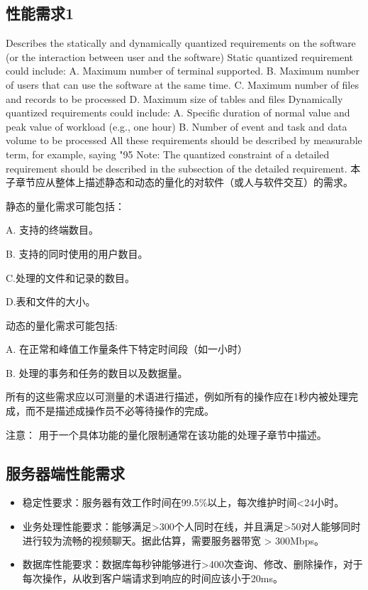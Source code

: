 \subsection{性能需求1}
Describes the statically and dynamically quantized requirements on the software (or the interaction between user and the software)
Static quantized requirement could include:
A. Maximum number of terminal supported.
B. Maximum number of users that can use the software at the same time.
C. Maximum number of files and records to be processed
D. Maximum size of  tables and files
Dynamically quantized requirements could include:
A. Specific duration of normal value and peak value of workload (e.g., one hour)
B. Number of event and task and data volume to be processed 
All these requirements should be described by measurable term, for example, saying "95%
Note: The quantized constraint of a detailed requirement should be described in the subsection of the detailed requirement.
本子章节应从整体上描述静态和动态的量化的对软件（或人与软件交互）的需求。

静态的量化需求可能包括：

A. 支持的终端数目。

B. 支持的同时使用的用户数目。

C.处理的文件和记录的数目。

D.表和文件的大小。

动态的量化需求可能包括:

A. 在正常和峰值工作量条件下特定时间段（如一小时）

B. 处理的事务和任务的数目以及数据量。

所有的这些需求应以可测量的术语进行描述，例如所有的操作应在1秒内被处理完成，而不是描述成操作员不必等待操作的完成。

注意： 用于一个具体功能的量化限制通常在该功能的处理子章节中描述。
\fi
\subsection{服务器端性能需求}
\begin{itemize}
	\item 稳定性要求：服务器有效工作时间在99.5\%以上，每次维护时间<24小时。
	\item 业务处理性能要求：能够满足>300个人同时在线，并且满足>50对人能够同时进行较为流畅的视频聊天。据此估算，需要服务器带宽 > 300Mbps。
	\item 数据库性能要求：数据库每秒钟能够进行>400次查询、修改、删除操作，对于每次操作，从收到客户端请求到响应的时间应该小于20ms。
\end{itemize}
